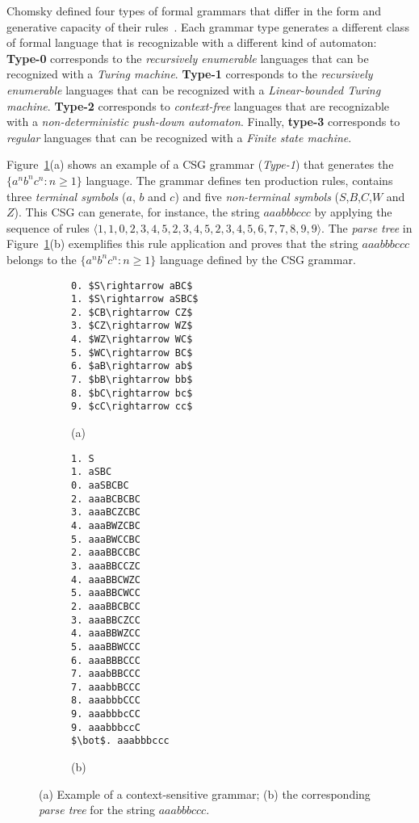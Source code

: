 \documentclass[letterpaper]{article} %
\newcommand{\tup}[1]{{\langle #1 \rangle}}
\begin{document}
Chomsky defined four types of formal grammars that differ in the form and generative capacity of their rules~\cite{chomsky2002syntactic}. Each grammar type generates a different class of formal language that is recognizable with a different kind of automaton: {\bf Type-0} corresponds to the {\em recursively enumerable} languages that can be recognized with a {\em Turing machine}. {\bf Type-1} corresponds to the {\em recursively enumerable} languages that can be recognized with a {\em Linear-bounded Turing machine}. {\bf Type-2} corresponds to {\em context-free} languages that are recognizable with a {\em non-deterministic push-down automaton}. Finally, {\bf type-3} corresponds to {\em regular} languages that can be recognized with a {\em Finite state machine}.

Figure~\ref{fig:csg}(a) shows an example of a CSG grammar ({\em Type-1}) that generates the $\{a^nb^nc^n : n \geq 1 \}$ language. The grammar defines ten production rules, contains three {\em terminal symbols} ($a$, $b$ and $c$) and five {\em non-terminal symbols} ($S$,$B$,$C$,$W$ and $Z$). This CSG can generate, for instance, the string $aaabbbccc$ by applying the sequence of rules $\tup{1,1,0,2,3,4,5,2,3,4,5,2,3,4,5,6,7,7,8,9,9}$. The {\it parse tree} in Figure~\ref{fig:csg}(b) exemplifies this rule application and proves that the string $aaabbbccc$ belongs to the $\{a^nb^nc^n : n \geq 1 \}$ language defined by the CSG grammar.

\begin{figure}
    \begin{subfigure}[]{0.3\textwidth}
      \begin{lstlisting}
0. $S\rightarrow aBC$
1. $S\rightarrow aSBC$
2. $CB\rightarrow CZ$
3. $CZ\rightarrow WZ$
4. $WZ\rightarrow WC$
5. $WC\rightarrow BC$
6. $aB\rightarrow ab$
7. $bB\rightarrow bb$	
8. $bC\rightarrow bc$
9. $cC\rightarrow cc$     
      \end{lstlisting}

	\hspace*{1.8cm}(a)
  \end{subfigure}
  \begin{subfigure}[]{0.15\textwidth}
  \begin{tiny}  
\begin{lstlisting}
1. S
1. aSBC
0. aaSBCBC
2. aaaBCBCBC
3. aaaBCZCBC
4. aaaBWZCBC
5. aaaBWCCBC
2. aaaBBCCBC
3. aaaBBCCZC
4. aaaBBCWZC
5. aaaBBCWCC
2. aaaBBCBCC
3. aaaBBCZCC
4. aaaBBWZCC
5. aaaBBWCCC
6. aaaBBBCCC
7. aaabBBCCC
7. aaabbBCCC
8. aaabbbCCC
9. aaabbbcCC
9. aaabbbccC
$\bot$. aaabbbccc 
\end{lstlisting}
  \end{tiny}    
\hspace*{.3cm}(b)
  \end{subfigure}

  \caption{\small (a) Example of a context-sensitive grammar; (b) the corresponding {\it parse tree} for the string $aaabbbccc$.}
  \label{fig:csg}
\end{figure}
\end{document}
